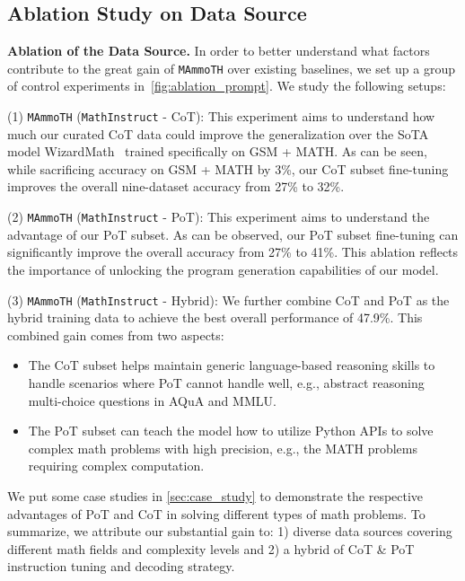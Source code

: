 \subsection{Ablation Study on Data Source}
\textbf{Ablation of the Data Source.} In order to better understand what factors contribute to the great gain of \texttt{MAmmoTH} over existing baselines, we set up a group of control experiments in~\autoref{fig:ablation_prompt}. We study the following setups:  

(1) \texttt{MAmmoTH} (\texttt{MathInstruct} - CoT): This experiment aims to understand how much our curated CoT data could improve the generalization over the SoTA model WizardMath~\citep{luo2023wizardmath}  trained specifically on GSM + MATH. As can be seen, while sacrificing accuracy on GSM + MATH by 3\%, our CoT subset fine-tuning improves the overall nine-dataset accuracy from 27\% to 32\%. 

(2) \texttt{MAmmoTH} (\texttt{MathInstruct} - PoT): This experiment aims to understand the advantage of our PoT subset. As can be observed, our PoT subset fine-tuning can significantly improve the overall accuracy from 27\% to 41\%. This ablation reflects the importance of unlocking the program generation capabilities of our model.

(3) \texttt{MAmmoTH} (\texttt{MathInstruct} - Hybrid): We further combine CoT and PoT as the hybrid training data to achieve the best overall performance of 47.9\%. This combined gain comes from two aspects:

\begin{itemize}[leftmargin=*,itemsep=0pt, topsep=0pt, partopsep=0pt]
    \item The CoT subset helps maintain generic language-based reasoning skills to handle scenarios where PoT cannot handle well, e.g., abstract reasoning multi-choice questions in AQuA and MMLU.
    \item The PoT subset can teach the model how to utilize Python APIs to solve complex math problems with high precision, e.g., the MATH problems requiring complex computation.
\end{itemize}

We put some case studies in \autoref{sec:case_study} to demonstrate the respective advantages of PoT and CoT in solving different types of math problems. To summarize, we attribute our substantial gain to: 1) diverse data sources covering different math fields and complexity levels and 2) a hybrid of CoT \& PoT instruction tuning and decoding strategy. 


